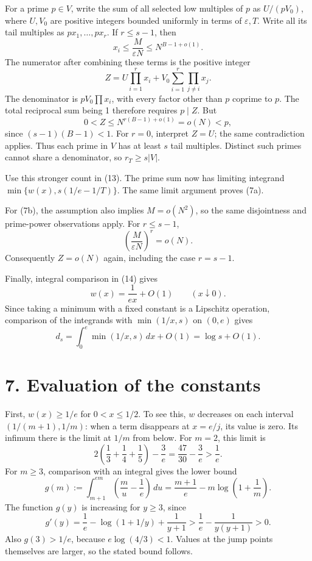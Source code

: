 \documentclass[11pt]{article}
\begin{document}
For a prime \(p\in V\), write the sum of all selected low multiples of \(p\) as \(U/(pV_0)\), where \(U,V_0\) are positive integers bounded uniformly in terms of \(\varepsilon,T\). Write all its tail multiples as \(px_1,\ldots,px_r\). If \(r\le s-1\), then
\[
x_i\le\frac M{\varepsilon N}\le N^{B-1+o(1)}.
\]
The numerator after combining these terms is the positive integer
\[
Z=U\prod_{i=1}^r x_i
 +V_0\sum_{i=1}^r\prod_{j\ne i}x_j.
\]
The denominator is \(pV_0\prod x_i\), with every factor other than \(p\) coprime to \(p\). The total reciprocal sum being 1 therefore requires \(p\mid Z\). But
\[
0<Z\le N^{r(B-1)+o(1)}=o(N)<p,
\]
since \((s-1)(B-1)<1\). For \(r=0\), interpret \(Z=U\); the same contradiction applies. Thus each prime in \(V\) has at least \(s\) tail multiples. Distinct such primes cannot share a denominator, so \(r_T\ge s|V|\).

Use this stronger count in (13). The prime sum now has limiting integrand \(\min\{w(x),s(1/e-1/T)\}\). The same limit argument proves (7a).

For (7b), the assumption also implies \(M=o(N^2)\), so the same disjointness and prime-power observations apply. For \(r\le s-1\),
\[
\left(\frac M{\varepsilon N}\right)^r=o(N).
\]
Consequently \(Z=o(N)\) again, including the case \(r=s-1\).

Finally, integral comparison in (14) gives
\[
w(x)=\frac1{ex}+O(1)\qquad(x\downarrow0).
\]
Since taking a minimum with a fixed constant is a Lipschitz operation, comparison of the integrands with \(\min(1/x,s)\) on \((0,e)\) gives
\[
d_s=\int_0^e\min(1/x,s)\,dx+O(1)=\log s+O(1).
\]

\section*{7. Evaluation of the constants}

First, \(w(x)\ge1/e\) for \(0<x\le1/2\). To see this, \(w\) decreases on each interval \((1/(m+1),1/m)\): when a term disappears at \(x=e/j\), its value is zero. Its infimum there is the limit at \(1/m\) from below. For \(m=2\), this limit is
\[
2\left(\frac13+\frac14+\frac15\right)-\frac3e
=\frac{47}{30}-\frac3e>\frac1e.
\]
For \(m\ge3\), comparison with an integral gives the lower bound
\[
g(m):=\int_{m+1}^{em}\left(\frac m u-\frac1e\right)\,du
=\frac{m+1}{e}-m\log\left(1+\frac1m\right).
\]
The function \(g(y)\) is increasing for \(y\ge3\), since
\[
g'(y)=\frac1e-\log(1+1/y)+\frac1{y+1}
>\frac1e-\frac1{y(y+1)}>0.
\]
Also \(g(3)>1/e\), because \(e\log(4/3)<1\). Values at the jump points themselves are larger, so the stated bound follows.
\end{document}
